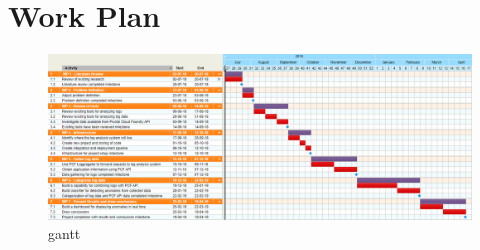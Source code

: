 \chapter{Work Plan}

\begin{figure}[h!]
  \centering
  \includegraphics[width=1.0\textwidth]{./figures/gantt.png}
  \caption{gantt}
  \label{fig:gantt}
\end{figure}

